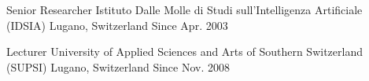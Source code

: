 \begin{cventries}
\cventry
{Senior Researcher}
{Istituto Dalle Molle di Studi sull'Intelligenza Artificiale (IDSIA)}
{Lugano, Switzerland}
{Since Apr. 2003}
{}

\cventry
{Lecturer}
{University of Applied Sciences and Arts of Southern Switzerland (SUPSI)}
{Lugano, Switzerland}
{Since Nov. 2008}
{}

\end{cventries}
